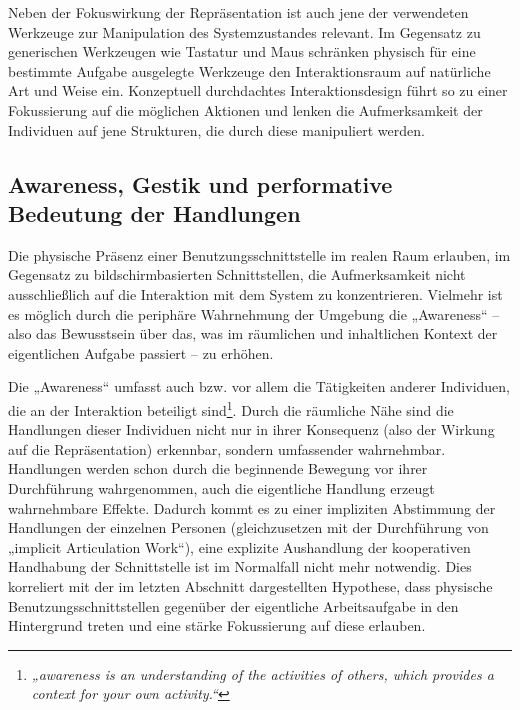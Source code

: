 Neben der Fokuswirkung der Repräsentation ist auch jene der verwendeten Werkzeuge zur Manipulation des Systemzustandes relevant. Im Gegensatz zu generischen Werkzeugen wie Tastatur und Maus schränken physisch für eine bestimmte Aufgabe ausgelegte Werkzeuge den Interaktionsraum auf natürliche Art und Weise ein. Konzeptuell durchdachtes Interaktionsdesign führt so zu einer Fokussierung auf die möglichen Aktionen und lenken die Aufmerksamkeit der Individuen auf jene Strukturen, die durch diese manipuliert werden.


\subsection{Awareness, Gestik und performative Bedeutung der Handlungen} %
\label{sub:awareness_gestik_und_performative_bedeutung_der_handlungen}

Die physische Präsenz einer Benutzungsschnittstelle im realen Raum erlauben, im Gegensatz zu bildschirmbasierten Schnittstellen, die Aufmerksamkeit nicht ausschließlich auf die Interaktion mit dem System zu konzentrieren. Vielmehr ist es möglich durch die periphäre Wahrnehmung der Umgebung die „Awareness“ \citep{Dourish92} -- also das Bewusstsein über das, was im räumlichen und inhaltlichen Kontext der eigentlichen Aufgabe passiert -- zu erhöhen. 

Die „Awareness“ umfasst auch bzw. vor allem die Tätigkeiten anderer Individuen, die an der Interaktion beteiligt sind\footnote{\emph{„awareness is an understanding of the activities of others, which provides a context for your own activity.“}\citep[][S. 1]{Dourish92}}. Durch die räumliche Nähe sind die Handlungen dieser Individuen nicht nur in ihrer Konsequenz (also der Wirkung auf die Repräsentation) erkennbar, sondern umfassender wahrnehmbar. Handlungen werden schon durch die beginnende Bewegung vor ihrer Durchführung wahrgenommen, auch die eigentliche Handlung erzeugt wahrnehmbare Effekte. Dadurch kommt es zu einer impliziten Abstimmung der Handlungen der einzelnen Personen (gleichzusetzen mit der Durchführung von „implicit Articulation Work“), eine explizite Aushandlung der kooperativen Handhabung der Schnittstelle ist im Normalfall nicht mehr notwendig. Dies korreliert mit der im letzten Abschnitt dargestellten Hypothese, dass physische Benutzungsschnittstellen gegenüber der eigentliche Arbeitsaufgabe in den Hintergrund treten und eine stärke Fokussierung auf diese erlauben.

